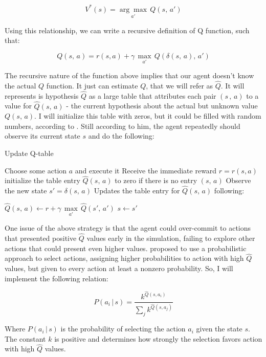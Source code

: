 \documentclass[a4paper]{article}
\begin{document}
$$V^{*}(s) = \underset{a'}{\arg \max} \, Q(s, \, a')$$

Using this relationship, we can write a recursive definition of Q function, such that:

$$Q(s, \, a) = r(s, a) + \gamma \, \underset{a'}{\max} \, Q(\delta(s,\, a), \, a')$$

The recursive nature of the function above implies that our agent doesn't know the actual $Q$ function. It just can estimate $Q$, that we will refer as $\hat{Q}$. It will represents is hypothesis $\hat{Q}$ as a large table that attributes each pair $(s\, , \, a)$ to a value for $\hat{Q}(s,\, a)$ - the current hypothesis about the actual but unknown value $Q(s, \, a)$. I will initialize this table with zeros, but it could be filled with random numbers, according to \cite{Mitchell}. Still according to him, the agent repeatedly should observe its current state $s$ and do the following:

\begin{algorithm}
\caption{Update Q-table}\label{alg:qtable}
\begin{algorithmic}[1]
  \State Choose some action $a$ and execute it
  \State Receive the immediate reward $r = r(s, a)$
  \State initialize the table entry $\hat{Q}(s, \, a)$ to zero if there is no entry $(s, \, a)$
  \State Observe the new state $s' = \delta(s, \,a)$
  \State Updates the table entry for $\hat{Q}(s, \, a)$ following:

    \do $\hat{Q}(s, \, a) \leftarrow r + \gamma \, \underset{a'}{\max}\, \hat{Q}(s', \, a')$
  \State $s \leftarrow s'$
\EndLoop
\end{algorithmic}
\end{algorithm}

One issue of the above strategy is that the agent could over-commit to actions that presented positive $\hat{Q}$ values early in the simulation, failing to explore other actions that could present even higher values. \cite{Mitchell} proposed to use a probabilistic approach to select actions, assigning higher probabilities to action with high $\hat{Q}$ values, but given to every action at least a nonzero probability. So, I will implement the following relation:

$$P(a_i\, | \,s ) = \frac{k ^{\hat{Q}(s, a_i)}}{\sum_j k^{\hat{Q}(s, a_j)}}$$

Where $P(a_i\, | \,s )$ is the probability of selecting the action $a_i$ given the state $s$. The constant $k$ is positive and determines how strongly the selection favors action with high $\hat{Q}$ values.
\end{document}
